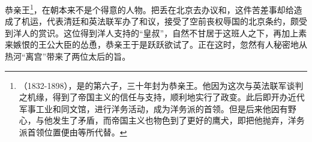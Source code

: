 恭亲王\footnote{（1832-1898），是的第六子，三十年封为恭亲王。他因为这次与英法联军谈判之机缘，得到了帝国主义的信任与支持，顺利地实行了政变。此后即开办近代军事工业和同文馆，进行洋务活动，成为洋务派的首领。但是后来他因有野心，与他发生了矛盾，而帝国主义也物色到了更好的鹰犬，即把他抛弃，洋务派首领位置便由等所代替。}，在朝本来不是个得意的人物。把丢在北京去办议和，这件苦差事却给造成了机运，代表清廷和英法联军办了和议，接受了空前丧权辱国的北京条约，颇受到洋人的赏识。这位得到洋人支持的“皇叔”，自然不甘居于这班人之下，再加上素来嫉恨的王公大臣的怂恿，恭亲王于是跃跃欲试了。正在这时，忽然有人秘密地从热河“离宫”带来了两位太后的旨。\\

